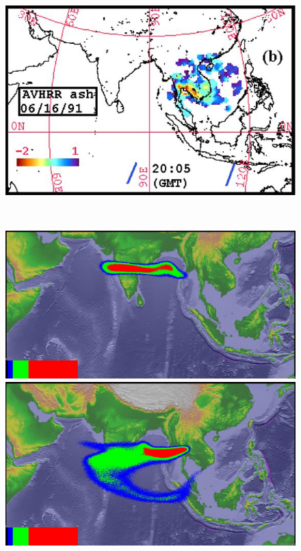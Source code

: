 \begin{figure}[!htb]
\begin{minipage}{.325 \textwidth}
    \end{minipage}%
    \begin{minipage}{.325 \textwidth}
        \centering
        \includegraphics[width=0.99 \textwidth]{Chapter-7/Figures/OB-ash-31hr-ash}
    \end{minipage}%
    \\
        \begin{minipage}{.325\textwidth}
        \centering
        \includegraphics[width=0.99 \textwidth]{Chapter-7/Figures/bent-55hr-ash}
    \end{minipage}%
    \begin{minipage}{.325 \textwidth}
        \centering
        \includegraphics[width=0.99 \textwidth]{Chapter-7/Figures/SPH-Plume-55hr-ash}

\end{minipage}
\end{figure}
